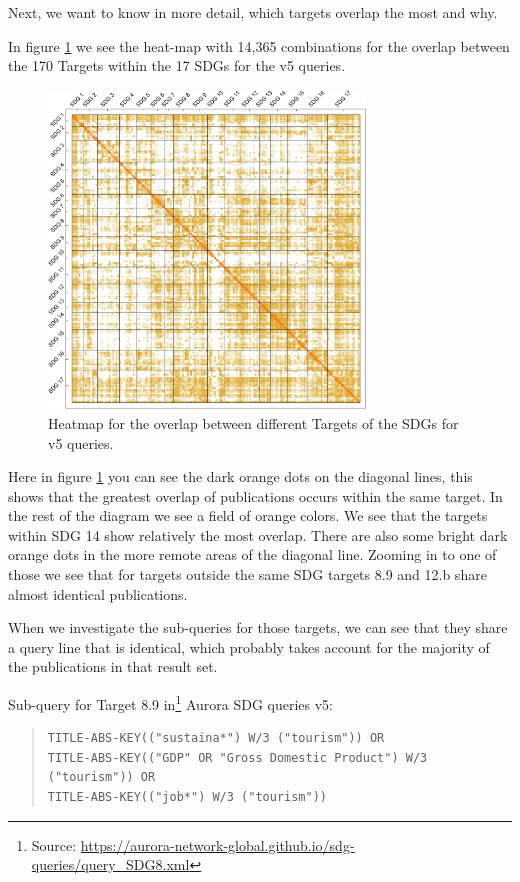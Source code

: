\documentclass{article}
\begin{document}
Next, we want to know in more detail, which targets overlap the most and why.

In  figure \ref{heatmapoverlapv5subqueries} we see the heat-map with 14,365 combinations for the overlap between the 170 Targets within the 17 SDGs for the v5 queries. 

\begin{figure}[H]
	\centering
  \includegraphics[width=0.75\textwidth]{figures/overlap_per_subquery.pdf}
	\caption{Heatmap for the overlap between different Targets of the SDGs for v5 queries.}
	\label{heatmapoverlapv5subqueries}
\end{figure}

Here in figure \ref{heatmapoverlapv5subqueries} you can see the dark orange dots on the diagonal lines, this shows that the greatest overlap of publications occurs within the same target. In the rest of the diagram we see a field of orange colors. We see that the targets within SDG 14 show relatively the most overlap. There are also some bright dark orange dots in the more remote areas of the diagonal line. Zooming in to one of those we see that for targets outside the same SDG targets 8.9 and 12.b share almost identical publications.

When we investigate the sub-queries for those targets, we can see that they share a query line that is identical, which probably takes account for the majority of the publications in that result set.

Sub-query for Target 8.9 in\footnote{ Source: \url{https://aurora-network-global.github.io/sdg-queries/query_SDG8.xml}} Aurora SDG queries v5: 
\begin{quote}
\begin{verbatim}
TITLE-ABS-KEY(("sustaina*") W/3 ("tourism")) OR 
TITLE-ABS-KEY(("GDP" OR "Gross Domestic Product") W/3 ("tourism")) OR 
TITLE-ABS-KEY(("job*") W/3 ("tourism"))
\end{verbatim}
\end{quote}
\end{document}
